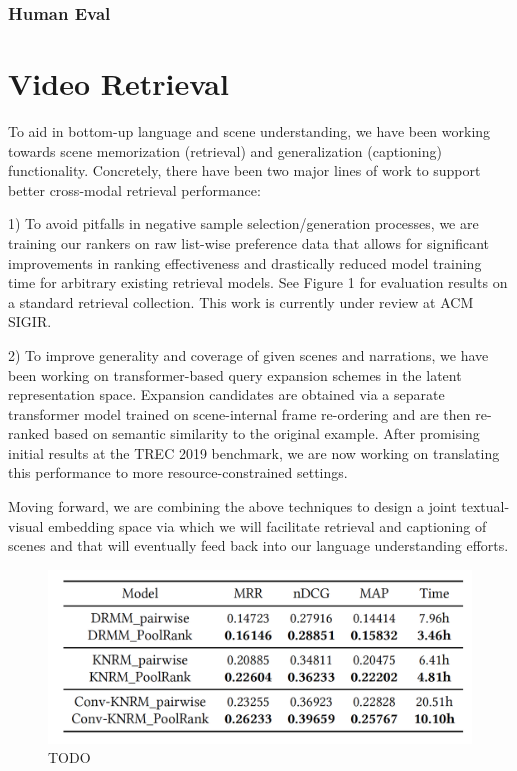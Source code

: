 \documentclass[11pt]{article}
\begin{document}
\subsubsection{Human Eval}

\section{Video Retrieval} 
\label{sec:ir}

To aid in bottom-up language and scene understanding, we have been working towards scene memorization (retrieval) and generalization (captioning) functionality. Concretely, there have been two major lines of work to support better cross-modal retrieval performance: 

1) To avoid pitfalls in negative sample selection/generation processes, we are training our rankers on raw list-wise preference data that allows for significant improvements in ranking effectiveness and drastically reduced model training time for arbitrary existing retrieval models. See Figure 1 for evaluation results on a standard retrieval collection. This work is currently under review at ACM SIGIR.

2) To improve generality and coverage of given scenes and narrations, we have been working on transformer-based query expansion schemes in the latent representation space. Expansion candidates are obtained via a separate transformer model trained on scene-internal frame re-ordering and are then re-ranked based on semantic similarity to the original example. After promising initial results at the TREC 2019 benchmark, we are now working on translating this performance to more resource-constrained settings.

Moving forward, we are combining the above techniques to design a joint textual-visual embedding space via which we will facilitate retrieval and captioning of scenes and that will eventually feed back into our language understanding efforts. 

\begin{figure}[ht!]
\includegraphics[width=\linewidth]{figures/ir-table}
\caption{TODO}
\end{figure}
\end{document}
